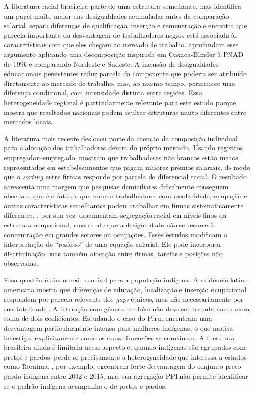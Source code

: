 \documentclass[12pt]{article}
\begin{document}
A literatura racial brasileira parte de uma estrutura semelhante, mas identifica um papel 
muito maior das desigualdades acumuladas antes da comparação salarial. \citet{soares2000} 
separa diferenças de qualificação, inserção e remuneração e encontra que parcela importante 
da desvantagem de trabalhadores negros está associada às características com que eles chegam 
ao mercado de trabalho. \citet{campante2004} aprofundam esse argumento aplicando uma 
decomposição inspirada em Oaxaca-Blinder à PNAD de 1996 e comparando Nordeste e Sudeste. 
A inclusão de desigualdades educacionais persistentes reduz parcela do componente que poderia 
ser atribuído diretamente ao mercado de trabalho, mas, ao mesmo tempo, permanece uma diferença 
condicional, com intensidade distinta entre regiões. Essa heterogeneidade regional é 
particularmente relevante para este estudo porque mostra que resultados nacionais podem 
ocultar estruturas muito diferentes entre mercados locais.

A literatura mais recente deslocou parte da atenção da composição individual para a alocação 
dos trabalhadores dentro do próprio mercado. Usando registros empregador–empregado, 
\citet{gerard2021} mostram que trabalhadores não brancos estão menos representados em 
estabelecimentos que pagam maiores prêmios salariais, de modo que o \textit{sorting} entre firmas
responde por parcela do diferencial racial. O resultado acrescenta uma margem que pesquisas 
domiciliares dificilmente conseguem observar, que é o fato de que mesmo trabalhadores com escolaridade, ocupação 
e outras características semelhantes podem trabalhar em firmas sistematicamente diferentes. 
\citet{cardoso2025}, por sua vez, documentam segregação racial em níveis finos da estrutura 
ocupacional, mostrando que a desigualdade não se resume à concentração em grandes setores ou 
ocupações. Esses estudos modificam a interpretação do “resíduo” de uma equação salarial. Ele 
pode incorporar discriminação, mas também alocação entre firmas, tarefas e posições não 
observadas.

Essa questão é ainda mais sensível para a população indígena. A evidência latino-americana 
mostra que diferenças de educação, localização e inserção ocupacional respondem por parcela 
relevante dos \textit{gaps} étnicos, mas não necessariamente por sua totalidade 
\citep{canelas2014, canedo2019}. A interação com gênero também não deve ser tratada como 
mera soma de dois coeficientes. Estudando o caso do Peru, \citet{kolev2015} encontram uma desvantagem 
particularmente intensa para mulheres indígenas, o que motiva investigar explicitamente 
como as duas dimensões se combinam. A literatura brasileira ainda é limitada nesse aspecto 
e, quando indígenas são agrupados com pretos e pardos, perde-se precisamente a heterogeneidade 
que interessa a estados como Roraima. \citet{marques2024}, por exemplo, encontram forte 
desvantagem do conjunto preto-pardo-indígena entre 2002 e 2015, mas sua agregação PPI não 
permite identificar se o padrão indígena acompanha o de pretos e pardos.
\end{document}
